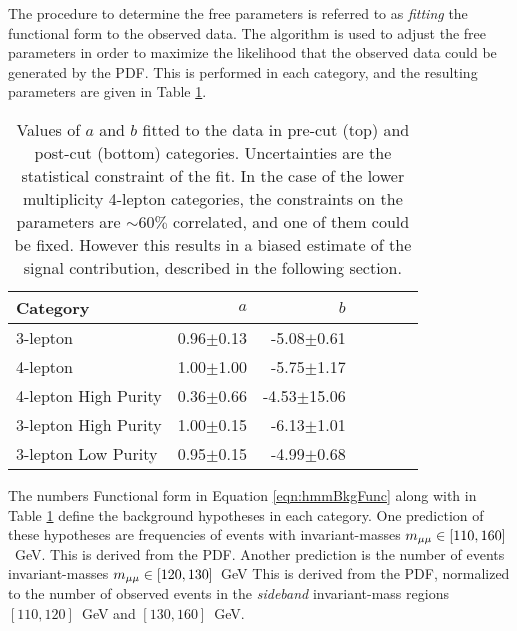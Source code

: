 The procedure to determine the free parameters is referred to as \emph{fitting} the functional form to the observed data.
The  algorithm is used to adjust the free parameters in order to maximize the likelihood that the observed data could be generated by the PDF.
This is performed in each category, and the resulting parameters are given in Table \ref{tab:hmmBkgFitParams}.

\begin{table}[htp]
\begin{center}
\begin{tabular}{l r r r r r r}
\toprule
Category & $a$ & $b$ \\
\midrule
3-lepton & 0.96$\pm$0.13 & -5.08$\pm$0.61 \\
4-lepton & 1.00$\pm$1.00 & -5.75$\pm$1.17 \\
\midrule
4-lepton High Purity & 0.36$\pm$0.66 & -4.53$\pm$15.06 \\
3-lepton High Purity & 1.00$\pm$0.15 & -6.13$\pm$1.01 \\
3-lepton Low Purity  & 0.95$\pm$0.15 & -4.99$\pm$0.68 \\
\bottomrule
\end{tabular}
\caption{Values of $a$ and $b$ fitted to the data in pre-cut (top) and post-cut (bottom) categories. Uncertainties are the statistical constraint of the fit. In the case of the lower multiplicity 4-lepton categories, the constraints on the parameters are $\sim60\%$ correlated, and one of them could be fixed. However this results in a biased estimate of the signal contribution, described in the following section.}
\label{tab:hmmBkgFitParams}
\end{center}
\end{table}

The numbers Functional form in Equation \ref{eqn:hmmBkgFunc} along with in Table \ref{tab:hmmBkgFitParams} define the background hypotheses in each category.
One prediction of these hypotheses are frequencies of events with invariant-masses $m_{\mu\mu}\in[110,160]$~GeV.
This is derived from the PDF.
Another prediction is the number of events invariant-masses $m_{\mu\mu}\in[120,130]$~GeV
This is derived from the PDF, normalized to the number of observed events in the \emph{sideband} invariant-mass regions $[110,120]$~GeV and $[130,160]$~GeV.
